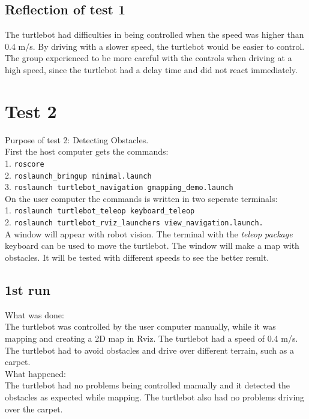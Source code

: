 \subsection{Reflection of test 1}
The turtlebot had difficulties in being controlled when the speed was higher than 0.4 m/s. By driving with a slower speed, the turtlebot would be easier to control.
The group experienced to be more careful with the controls when driving at a high speed, since the turtlebot had a delay time and did not react immediately.

%
%

\section{Test 2}
Purpose of test 2: Detecting Obstacles.\\ 
First the host computer gets the commands:\\
1. \texttt{roscore}\\
2. \texttt{roslaunch\_bringup minimal.launch}\\
3. \texttt{roslaunch turtlebot\_navigation gmapping\_demo.launch}\\
On the user computer the commands is written in two seperate terminals:\\
1. \texttt{roslaunch turtlebot\_teleop keyboard\_teleop}\\
2. \texttt{roslaunch turtlebot\_rviz\_launchers view\_navigation.launch.}\\
A window will appear with robot vision. The terminal with the \textit{teleop package} keyboard can be used to move the turtlebot. The window will make a map with obstacles.
It will be tested with different speeds to see the better result.

\subsection{1st run}
What was done:\\
The turtlebot was controlled by the user computer manually, while it was mapping and creating a 2D map in Rviz. The turtlebot had a speed of 0.4 m/s. The turtlebot had to avoid obstacles and drive over different terrain, such as a carpet.\\
What happened:\\
The turtlebot had no problems being controlled manually and it detected the obstacles as expected while mapping. The turtlebot also had no problems driving over the carpet.

